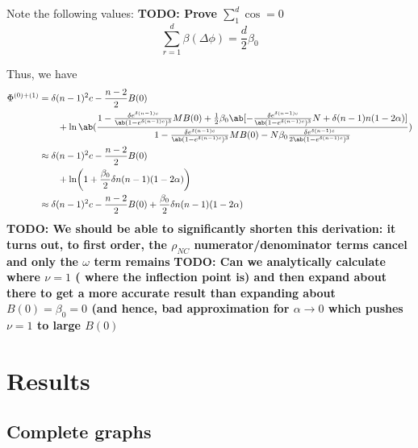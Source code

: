 \documentclass[pdflatex,lineno,referee,sn-mathphys-ay]{class/sn-jnl}
\begin{document}
Note the following values:
\textbf{TODO: Prove $\sum_1^d \cos = 0$}
\begin{equation}
  \sum_{r=1}^d \beta(\Delta \phi) = \frac{d}{2} \beta_0
\end{equation}

Thus, we have
\begin{equation}
  \begin{aligned}
    \Phi^{(0)+(1)} &=
\delta(n-1)^2 c - \frac{n-2}{2} B(0) \\
  &\qquad +
\ln\ab(
\frac{
1 -
    \frac{\delta e^{\delta(n-1)c}}{\ab(1-e^{\delta (n-1)c})^3}
  M B(0)
+
\frac{1}{2}\beta_0\ab[
-
    \frac{\delta e^{\delta(n-1)c}}{\ab(1-e^{\delta (n-1)c})^3} N
    +
\delta (n-1) n (1 - 2 \alpha)
]
}
{1 -
    \frac{\delta e^{\delta(n-1)c}}{\ab(1-e^{\delta (n-1)c})^3}
  M B(0)
  - N \beta_0 \frac{\delta e^{\delta(n-1)c}}{2\ab(1-e^{\delta (n-1)c})^3}
                  }
  )
  \\
  &\approx
\delta(n-1)^2 c - \frac{n-2}{2} B(0) \\
  &\qquad +
\ln \biggl(
  1 + \frac{\beta_0}{2} \delta n (n-1) (1-2\alpha)
\biggr)
  \\
  &\approx
  \delta(n-1)^2 c - \frac{n-2}{2} B(0) +
  \frac{\beta_0}{2} \delta n (n-1) (1-2\alpha)
\end{aligned}
\end{equation}
\textbf{TODO: We should be able to significantly shorten this
  derivation: it turns out, to first order, the $\rho_{NC}$
  numerator/denominator terms cancel and only the $\omega$ term remains}
\textbf{TODO: Can we analytically calculate where $\nu = 1$ (\ie{} where
  the inflection point is) and then expand about there to get a more
  accurate result than expanding about $B(0) = \beta_0 = 0$ (and hence,
  bad approximation for $\alpha \to 0$ which pushes $\nu=1$ to large
  $B(0)$}

\section{Results}
\subsection{Complete graphs}
\end{document}
